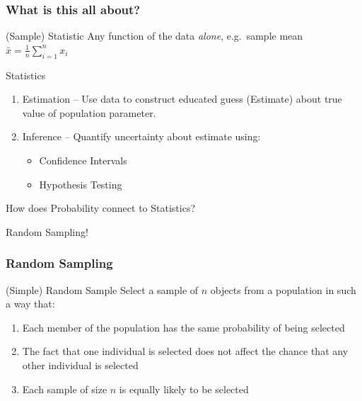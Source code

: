 \documentclass[handout]{beamer}
\begin{document}
\begin{frame}
\frametitle{What is this all about?}

\begin{block}{(Sample) Statistic}
Any function of the data \emph{alone}, e.g.\ sample mean $\bar{x} = \frac{1}{n}\sum_{i=1}^n x_i$
\end{block}

\begin{block}{Statistics}
	\begin{enumerate}
\item Estimation --  Use data to construct educated guess (Estimate) about true value of population parameter. 
\item Inference --  Quantify uncertainty about estimate using:
	\begin{itemize}
	
\item Confidence Intervals
\item Hypothesis Testing 
\end{itemize}

\end{enumerate}
\end{block}

\end{frame}

\begin{frame}
\begin{center}
	\Huge How does Probability connect to Statistics?
\end{center}
\end{frame}



\begin{frame}
\begin{center}
	\Huge Random Sampling!
\end{center}
\end{frame}


\begin{frame}
\frametitle{Random Sampling}

\begin{block}{(Simple) Random Sample}
Select a sample of $n$ objects from a population in such a way that:
	\begin{enumerate}
\item Each member of the population has the same probability of being selected 
\item The fact that one individual is selected does not affect the chance that any other individual is selected
\item Each sample of size $n$ is equally likely to be selected

\end{enumerate}
\end{block}

\end{frame}
\end{document}
